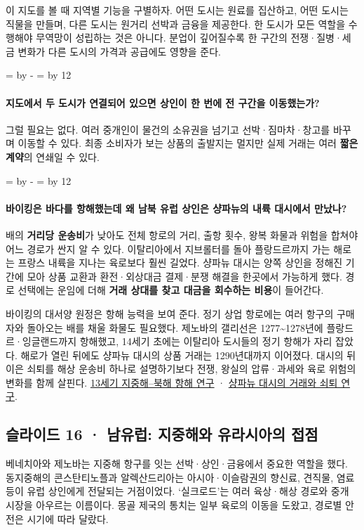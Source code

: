 \documentclass[10pt,a4paper]{article}
\newcommand{\ReserveQuestionSpace}{%
  \par\begingroup
  \dimen0=\pagegoal \advance\dimen0 by -\pagetotal
  \dimen2=\baselineskip \multiply\dimen2 by 12
  \ifdim\dimen0<\dimen2 \newpage\fi
  \endgroup}
\begin{document}
이 지도를 볼 때 지역별 기능을 구별하자. 어떤 도시는 원료를 집산하고, 어떤 도시는 직물을 만들며, 다른 도시는 원거리 선박과 금융을 제공한다. 한 도시가 모든 역할을 수행해야 무역망이 성립하는 것은 아니다. 분업이 깊어질수록 한 구간의 전쟁·질병·세금 변화가 다른 도시의 가격과 공급에도 영향을 준다.\par

\ReserveQuestionSpace
\paragraph{지도에서 두 도시가 연결되어 있으면 상인이 한 번에 전 구간을 이동했는가?}
그럴 필요는 없다. 여러 중개인이 물건의 소유권을 넘기고 선박·짐마차·창고를 바꾸며 이동할 수 있다. 최종 소비자가 보는 상품의 출발지는 멀지만 실제 거래는 여러 \textbf{짧은 계약}의 연쇄일 수 있다.\par

\ReserveQuestionSpace
\paragraph{바이킹은 바다를 항해했는데 왜 남북 유럽 상인은 샹파뉴의 내륙 대시에서 만났나?}
배의 \textbf{거리당 운송비}가 낮아도 전체 항로의 거리, 출항 횟수, 왕복 화물과 위험을 합쳐야 어느 경로가 싼지 알 수 있다. 이탈리아에서 지브롤터를 돌아 플랑드르까지 가는 해로는 프랑스 내륙을 지나는 육로보다 훨씬 길었다. 샹파뉴 대시는 양쪽 상인을 정해진 기간에 모아 상품 교환과 환전·외상대금 결제·분쟁 해결을 한곳에서 가능하게 했다. 경로 선택에는 운임에 더해 \textbf{거래 상대를 찾고 대금을 회수하는 비용}이 들어간다.\par

바이킹의 대서양 원정은 항해 능력을 보여 준다. 정기 상업 항로에는 여러 항구의 구매자와 돌아오는 배를 채울 화물도 필요했다. 제노바의 갤리선은 1277\textasciitilde{}1278년에 플랑드르·잉글랜드까지 항해했고, 14세기 초에는 이탈리아 도시들의 정기 항해가 자리 잡았다. 해로가 열린 뒤에도 샹파뉴 대시의 상품 거래는 1290년대까지 이어졌다. 대시의 뒤이은 쇠퇴를 해상 운송비 하나로 설명하기보다 전쟁, 왕실의 압류·과세와 육로 위험의 변화를 함께 살핀다. \href{https://www.persee.fr/doc/rbph\_0035-0818\_1951\_num\_29\_4\_2120}{13세기 지중해–북해 항해 연구} · \href{https://sheilaghogilvie.com/wp-content/uploads/publications/Edwards-Ogilvie-2012-Champagne-Fairs.pdf}{샹파뉴 대시의 거래와 쇠퇴 연구}.\par

\subsection{슬라이드 16 · 남유럽: 지중해와 유라시아의 접점}
베네치아와 제노바는 지중해 항구를 잇는 선박·상인·금융에서 중요한 역할을 했다. 동지중해의 콘스탄티노플과 알렉산드리아는 아시아·이슬람권의 향신료, 견직물, 염료 등이 유럽 상인에게 전달되는 거점이었다. ‘실크로드’는 여러 육상·해상 경로와 중개 시장을 아우르는 이름이다. 몽골 제국의 통치는 일부 육로의 이동을 도왔고, 경로별 안전은 시기에 따라 달랐다.\par
\end{document}
